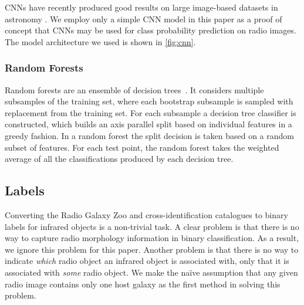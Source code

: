 \documentclass[fleqn,usenatbib,usedcolumn]{mnras}
\newcommand{\todo}[1]{ {\color{red}[{\bf TODO:~{#1}}]} }
\begin{document}

      CNNs have recently produced good results on large image-based datasets in
      astronomy \citep[e.g.][]{dieleman15cnn, lukic17compact}. We employ only a
      simple CNN model in this paper as a proof of concept that CNNs may be used
      for class probability prediction on radio images. The model architecture
      we used is shown in \autoref{fig:cnn}.

    \subsubsection{Random Forests}
    \label{sec:random-forests}

      Random forests are an ensemble of decision
      trees~\citep{breiman01random-forest}. It considers multiple subsamples
      of the training set, where each bootstrap subsample is sampled with
      replacement from the training set. For each subsample a decision tree
      classifier is constructed, which builds an axis parallel split based on
      individual features in a greedy fashion. In a random forest the split
      decision is taken based on a random subset of features. For each test
      point, the random forest takes the weighted average of all the
      classifications produced by each decision tree.

  \subsection{Labels}\label{labels}

    Converting the Radio Galaxy Zoo and \citet{norris06} cross-identification
    catalogues to binary labels for infrared objects is a non-trivial task. A
    clear problem is that there is no way to capture radio morphology
    information in binary classification. As a result, we ignore this problem
    for this paper. Another problem is that there is no way to indicate
    \emph{which} radio object an infrared object is associated with, only that
    it is associated with \emph{some} radio object. We make the na\"ive
    assumption that any given radio image contains only one host galaxy as the
    first method in solving this problem.
\end{document}
